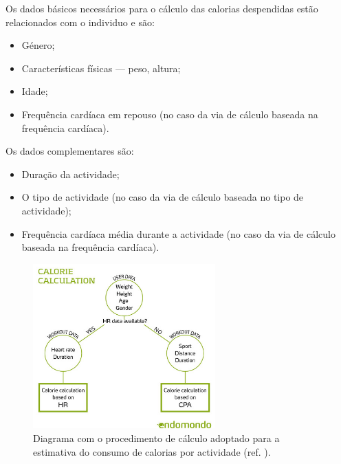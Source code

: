 \documentclass[a4paper,10pt]{report}
\begin{document}
Os dados básicos necessários para o cálculo das calorias despendidas estão relacionados com o individuo e são:
\begin{itemize}
 \item Género;
 \item Características físicas --- peso, altura;
 \item Idade;
 \item Frequência cardíaca em repouso (no caso da via de cálculo baseada na frequência cardíaca).
\end{itemize}

Os dados complementares são:
\begin{itemize}
 \item Duração da actividade;
 \item O tipo de actividade (no caso da via de cálculo baseada no tipo de actividade);
 \item Frequência cardíaca média durante a actividade (no caso da via de cálculo baseada na frequência cardíaca).
\end{itemize}

\begin{figure}
\centering
\includegraphics[width=7cm]{endomondoCalories.jpg}
\caption{Diagrama com o procedimento de cálculo adoptado para a estimativa do consumo de calorias por actividade (ref. \cite{endomondo}).}
\label{fig:caloriasProcedimento}
\end{figure}
\end{document}

